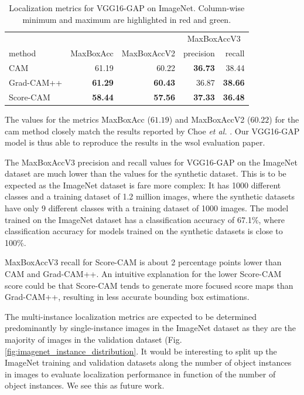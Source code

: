 \begin{table}[ht]
\centering
\begin{tabular}{lrrrr}
\toprule
 & & & \multicolumn{2}{c}{MaxBoxAccV3} \\
method & MaxBoxAcc & MaxBoxAccV2 & precision & recall \\
\cmidrule(lr){1-1} \cmidrule(lr){2-5}
CAM & 61.19 & 60.22 & \color{purple} \bfseries 36.73 & 38.44 \\
Grad-CAM++ & \color{teal} \bfseries 61.29 & \color{teal} \bfseries 60.43 & 36.87 & \color{teal} \bfseries 38.66 \\
Score-CAM & \color{purple} \bfseries 58.44 & \color{purple} \bfseries 57.56 & \color{teal} \bfseries 37.33 & \color{purple} \bfseries 36.48 \\
\bottomrule
\end{tabular}
\caption[Localization metrics for VGG16-GAP on ImageNet]{Localization metrics for VGG16-GAP on ImageNet. Column-wise minimum and maximum are highlighted in red and green.}
\label{tab:metrics_vgg16_gap_imagenet}
\end{table}

The values for the metrics MaxBoxAcc ($61.19$) and MaxBoxAccV2 ($60.22$) for the \acrshort{cam} method closely match the results reported by Choe \textit{et al.} \cite{choe2020evaluating}. Our VGG16-GAP model is thus able to reproduce the results in the \acrshort{wsol} evaluation paper.

The MaxBoxAccV3 precision and recall values for VGG16-GAP on the ImageNet dataset are much lower than the values for the synthetic dataset. This is to be expected as the ImageNet dataset is fare more complex: It has 1000 different classes and a training dataset of 1.2 million images, where the synthetic datasets have only 9 different classes with a training dataset of 1000 images. The model trained on the ImageNet dataset has a classification accuracy of 67.1\%, where classification accuracy for models trained on the synthetic datasets is close to 100\%. 

MaxBoxAccV3 recall for Score-CAM is about 2 percentage points lower than CAM and Grad-CAM++. An intuitive explanation for the lower Score-CAM score could be that Score-CAM tends to generate more focused score maps than Grad-CAM++, resulting in less accurate bounding box estimations. 

The multi-instance localization metrics are expected to be determined predominantly by single-instance images in the ImageNet dataset as they are the majority of images in the validation dataset (Fig. \ref{fig:imagenet_instance_distribution}. It would be interesting to split up the ImageNet training and validation datasets along the number of object instances in images to evaluate localization performance in function of the number of object instances. We see this as future work.

